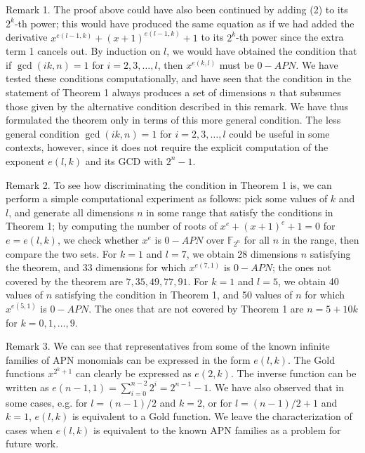 \documentclass[10pt]{article}
\begin{document}
Remark 1. The proof above could have also been continued by adding (2) to its $2^{k}$-th power; this would have produced the same equation as if we had added the derivative $x^{e(l-1, k)}+(x+1)^{e(l-1, k)}+1$ to its $2^{k}$-th power since the extra\\
term 1 cancels out. By induction on $l$, we would have obtained the condition that if $\operatorname{gcd}(i k, n)=1$ for $i=2,3, \ldots, l$, then $x^{e(k, l)}$ must be $0-A P N$. We have tested these conditions computationally, and have seen that the condition in the statement of Theorem 1 always produces a set of dimensions $n$ that subsumes those given by the alternative condition described in this remark. We have thus formulated the theorem only in terms of this more general condition. The less general condition $\operatorname{gcd}(i k, n)=1$ for $i=2,3, \ldots, l$ could be useful in some contexts, however, since it does not require the explicit computation of the exponent $e(l, k)$ and its GCD with $2^{n}-1$.

Remark 2. To see how discriminating the condition in Theorem 1 is, we can perform a simple computational experiment as follows: pick some values of $k$ and $l$, and generate all dimensions $n$ in some range that satisfy the conditions in Theorem 1; by computing the number of roots of $x^{e}+(x+1)^{e}+1=0$ for $e=e(l, k)$, we check whether $x^{e}$ is $0-A P N$ over $\mathbb{F}_{2^{n}}$ for all $n$ in the range, then compare the two sets. For $k=1$ and $l=7$, we obtain 28 dimensions $n$ satisfying the theorem, and 33 dimensions for which $x^{e(7,1)}$ is $0-A P N$; the ones not covered by the theorem are $7,35,49,77,91$. For $k=1$ and $l=5$, we obtain 40 values of $n$ satisfying the condition in Theorem 1, and 50 values of $n$ for which $x^{e(5,1)}$ is $0-A P N$. The ones that are not covered by Theorem 1 are $n=5+10 k$ for $k=0,1, \ldots, 9$.

Remark 3. We can see that representatives from some of the known infinite families of APN monomials can be expressed in the form $e(l, k)$. The Gold functions $x^{2^{k}+1}$ can clearly be expressed as $e(2, k)$. The inverse function can be written as $e(n-1,1)=\sum_{i=0}^{n-2} 2^{i}=2^{n-1}-1$. We have also observed that in some cases, e.g. for $l=(n-1) / 2$ and $k=2$, or for $l=(n-1) / 2+1$ and $k=1$, $e(l, k)$ is equivalent to a Gold function. We leave the characterization of cases when $e(l, k)$ is equivalent to the known APN families as a problem for future work.
\end{document}
